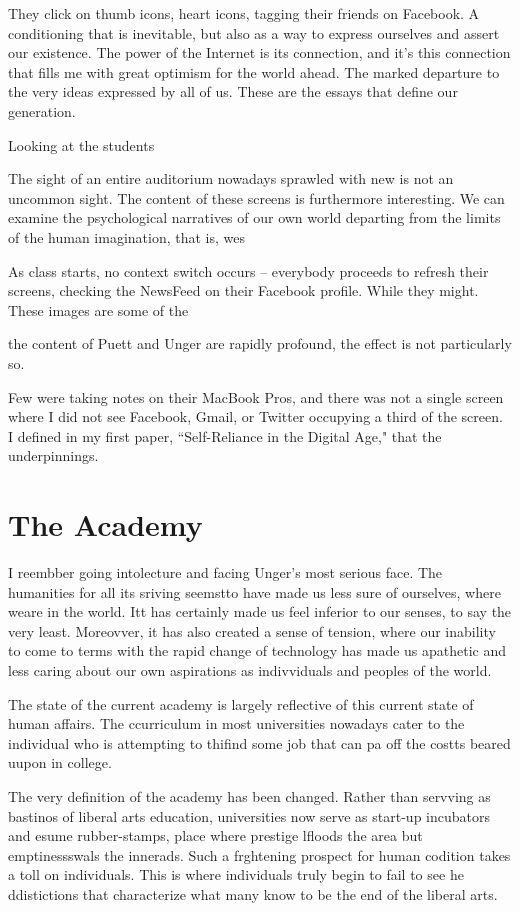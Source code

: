 \documentclass[12pt,letterpaper]{article}
\begin{document}
They click on thumb icons, heart icons, tagging their friends on Facebook.  A conditioning that is inevitable, but also as a way to express ourselves and assert our existence.  The power of the Internet is its connection, and it's this connection that fills me with great optimism for the world ahead.  The marked departure to the very ideas expressed by all of us.  These are the essays that define our generation.

Looking at the students 

The sight of an entire auditorium nowadays sprawled with new is not an uncommon sight.  The content of these screens is furthermore interesting.  We can examine the psychological narratives of our own world departing from the limits of the human imagination, that is, wes

As class starts, no context switch occurs -- everybody proceeds to refresh their screens, checking the NewsFeed on their Facebook profile.  While they might.  These images are some of the 

the content of Puett and Unger are rapidly profound, the effect is not particularly so.  

Few were taking notes on their MacBook Pros, and there was not a single screen where I did not see Facebook, Gmail, or Twitter occupying a third of the screen.  I defined in my first paper, ``Self-Reliance in the Digital Age," that the underpinnings.


\section{The Academy}
I reembber going intolecture and  facing Unger's most serious face.  The humanities for all its sriving seemstto have made us less sure  of ourselves, where weare in the world.  Itt has certainly made us feel inferior to our senses, to say the very least.  Moreovver, it has also created a  sense of tension, where our inability to come to terms with the rapid change of technology has made  us apathetic and less caring about our own aspirations as indivviduals and peoples of the world.

The state of the current academy is largely reflective  of this current state of human affairs.  The ccurriculum in most universities nowadays  cater to the individual who is attempting to thifind some job that can pa off the costts  beared uupon in college.

The very definition of the academy  has been changed.  Rather than servving as bastinos of liberal arts education, universities now serve as start-up incubators and esume rubber-stamps,   place where prestige lfloods the area but emptinessswals the innerads.  Such a frghtening prospect for human codition takes a toll on individuals.  This is where individuals truly begin to fail to see he ddistictions that characterize what many know to be the end of the liberal arts.
\end{document}
